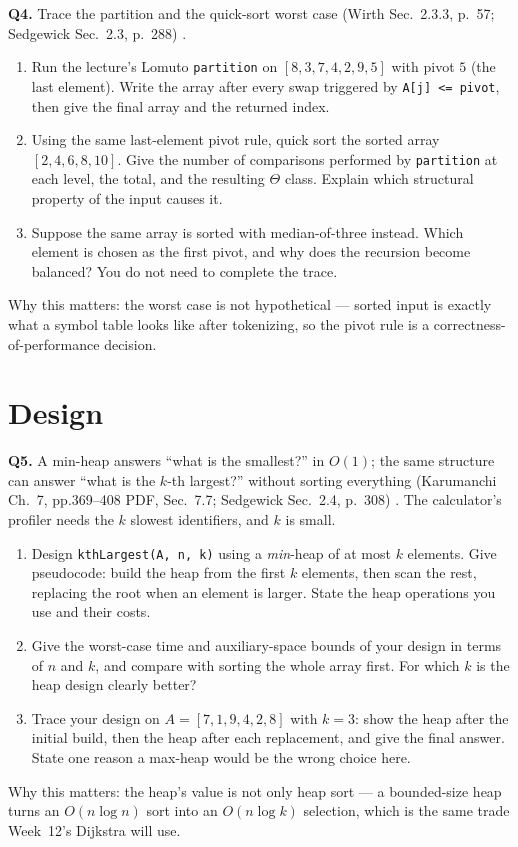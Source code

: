 \documentclass[11pt]{article}
\begin{document}
\textbf{Q4.} Trace the partition and the quick-sort worst case (Wirth Sec.~2.3.3, p.~57; Sedgewick Sec.~2.3, p.~288) \cite{Wirth2004_algorithms_data_structures,Sedgewick2011_algorithms}.
\begin{enumerate}
  \item[(a)] Run the lecture's Lomuto \texttt{partition} on $[8,3,7,4,2,9,5]$ with pivot $5$ (the last element). Write the array after every swap triggered by \texttt{A[j] <= pivot}, then give the final array and the returned index.
  \item[(b)] Using the same last-element pivot rule, quick sort the sorted array $[2,4,6,8,10]$. Give the number of comparisons performed by \texttt{partition} at each level, the total, and the resulting $\Theta$ class. Explain which structural property of the input causes it.
  \item[(c)] Suppose the same array is sorted with median-of-three instead. Which element is chosen as the first pivot, and why does the recursion become balanced? You do not need to complete the trace.
\end{enumerate}
Why this matters: the worst case is not hypothetical --- sorted input is exactly what a symbol table looks like after tokenizing, so the pivot rule is a correctness-of-performance decision.

\section{Design}

\textbf{Q5.} A min-heap answers ``what is the smallest?'' in $O(1)$; the same structure can answer ``what is the $k$-th largest?'' without sorting everything (Karumanchi Ch.~7, pp.369--408 PDF, Sec.~7.7; Sedgewick Sec.~2.4, p.~308) \cite{Karumanchi2017_data_structures_algorithms_made_easy,Sedgewick2011_algorithms}. The calculator's profiler needs the $k$ slowest identifiers, and $k$ is small.
\begin{enumerate}
  \item[(a)] Design \texttt{kthLargest(A, n, k)} using a \emph{min}-heap of at most $k$ elements. Give pseudocode: build the heap from the first $k$ elements, then scan the rest, replacing the root when an element is larger. State the heap operations you use and their costs.
  \item[(b)] Give the worst-case time and auxiliary-space bounds of your design in terms of $n$ and $k$, and compare with sorting the whole array first. For which $k$ is the heap design clearly better?
  \item[(c)] Trace your design on $A=[7,1,9,4,2,8]$ with $k=3$: show the heap after the initial build, then the heap after each replacement, and give the final answer. State one reason a max-heap would be the wrong choice here.
\end{enumerate}
Why this matters: the heap's value is not only heap sort --- a bounded-size heap turns an $O(n\log n)$ sort into an $O(n\log k)$ selection, which is the same trade Week~12's Dijkstra will use.
\end{document}
